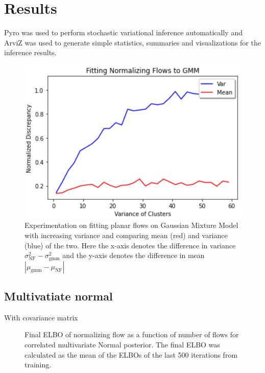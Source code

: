 \section{Results}

Pyro\cite{bingham2019pyro} was used to perform stochastic variational inference automatically and ArviZ\cite{kumar2019arviz} was used to generate simple statistics, summaries and visualizations for the inference results.

\begin{figure}
    \centering
    \includegraphics[scale=0.6]{figures/Mean_Var_really_accurate.PNG}
\caption{Experimentation on fitting planar flows on Gaussian Mixture Model with increasing variance and comparing mean (red) and variance (blue) of the two. Here the x-axis denotes the difference in variance $\sigma^2_{\mathrm{NF}}-\sigma^2_{\mathrm{gmm}}$ and the y-axis denotes the difference in mean $|\mu_{\mathrm{gmm}}-\mu_{\mathrm{NF}}|$ }
    \label{fig:my_label}
\end{figure}

\subsection{Multivatiate normal}

\lipsum[3]

With covariance matrix

\begin{figure}
    \centering
    \caption{Final ELBO of normalizing flow as a function of number of flows for correlated multivariate Normal posterior. The final ELBO was calculated as the mean of the ELBOs of the last 500 iterations from training.}
    \label{fig:planarvsradial}
\end{figure}


